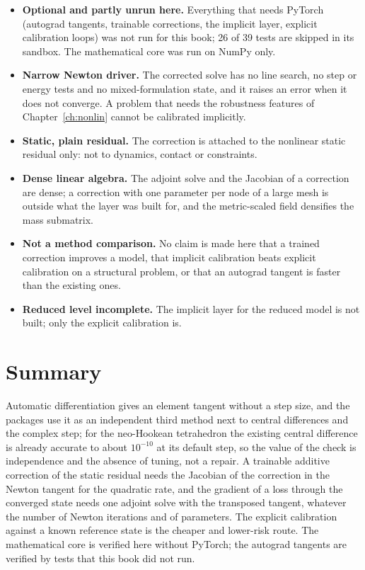 \begin{limitsbox}
\begin{itemize}
\item \textbf{Optional and partly unrun here.} Everything that needs PyTorch (autograd tangents, trainable corrections, the implicit layer, explicit calibration loops) was not run for this book; 26 of 39 tests are skipped in its sandbox. The mathematical core was run on NumPy only.
\item \textbf{Narrow Newton driver.} The corrected solve has no line search, no step or energy tests and no mixed-formulation state, and it raises an error when it does not converge. A problem that needs the robustness features of Chapter~\ref{ch:nonlin} cannot be calibrated implicitly.
\item \textbf{Static, plain residual.} The correction is attached to the nonlinear static residual only: not to dynamics, contact or constraints.
\item \textbf{Dense linear algebra.} The adjoint solve and the Jacobian of a correction are dense; a correction with one parameter per node of a large mesh is outside what the layer was built for, and the metric-scaled field densifies the mass submatrix.
\item \textbf{Not a method comparison.} No claim is made here that a trained correction improves a model, that implicit calibration beats explicit calibration on a structural problem, or that an autograd tangent is faster than the existing ones.
\item \textbf{Reduced level incomplete.} The implicit layer for the reduced model is not built; only the explicit calibration is.
\end{itemize}
\end{limitsbox}

\section{Summary}\label{sec:df-summary}

Automatic differentiation gives an element tangent without a step size, and the packages use it as an independent third method next to central differences and the complex step; for the neo-Hookean tetrahedron the existing central difference is already accurate to about $10^{-10}$ at its default step, so the value of the check is independence and the absence of tuning, not a repair. A trainable additive correction of the static residual needs the Jacobian of the correction in the Newton tangent for the quadratic rate, and the gradient of a loss through the converged state needs one adjoint solve with the transposed tangent, whatever the number of Newton iterations and of parameters. The explicit calibration against a known reference state is the cheaper and lower-risk route. The mathematical core is verified here without PyTorch; the autograd tangents are verified by tests that this book did not run.

